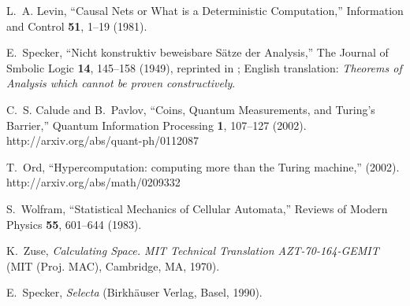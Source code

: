 \documentclass[pre,showpacs,showkeys,preprint]{revtex4}
\theoremstyle{definition}
\begin{document}
\begin{thebibliography}{10}
L.~A. Levin, \enquote{Causal Nets or What is a Deterministic Computation,}
  Information and Control {\bf 51}, 1--19 (1981).

E.~Specker, \enquote{Nicht konstruktiv beweisbare {S}\"atze der {A}nalysis,}
  The Journal of Smbolic Logic {\bf 14}, 145--158 (1949), reprinted in
  \cite[pp. 35--48]{specker-ges}; {E}nglish translation: {\it Theorems of
  Analysis which cannot be proven constructively}.

C.~S. Calude and B.~Pavlov, \enquote{Coins, Quantum Measurements, and
  {T}uring's Barrier,} Quantum Information Processing {\bf 1}, 107--127 (2002).
\newline http://arxiv.org/abs/quant-ph/0112087

T.~Ord, \enquote{Hypercomputation: computing more than the Turing machine,}
  (2002).
\newline http://arxiv.org/abs/math/0209332

S.~Wolfram, \enquote{Statistical Mechanics of Cellular Automata,} Reviews of
  Modern Physics {\bf 55}, 601--644 (1983).

K.~Zuse, {\em Calculating Space. MIT Technical Translation AZT-70-164-GEMIT\/}
  (MIT (Proj. MAC), Cambridge, MA, 1970).

E.~Specker, {\em Selecta\/} (Birkh{\"{a}}user Verlag, Basel, 1990).

\end{thebibliography}
\end{document}
